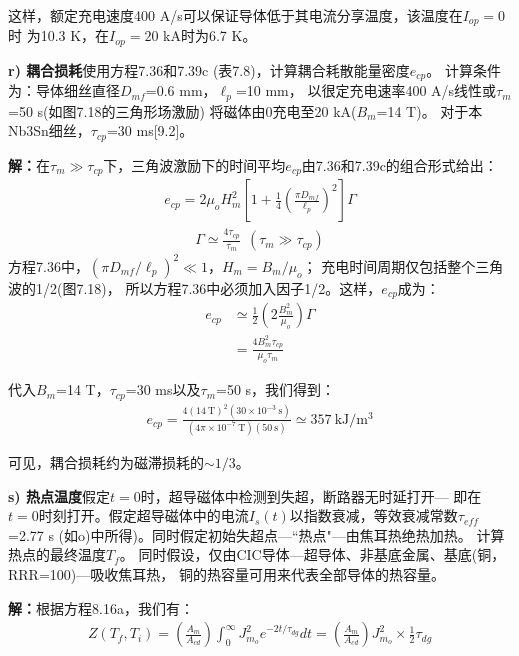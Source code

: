 这样，额定充电速度400 A/s可以保证导体低于其电流分享温度，该温度在$I_{op}=0$时
为10.3 K，在$I_{op}=20$ kA时为6.7 K。

\textbf{r) 耦合损耗}\qquad 使用方程7.36和7.39c (表7.8)，计算耦合耗散能量密度$e_{cp}$。
计算条件为：导体细丝直径$D_{mf}$=0.6 mm，$\ell_p$=10 mm，
以很定充电速率400 A/s线性或$\tau_m$=50 s(如图7.18的三角形场激励)
将磁体由0充电至20 kA($B_m$=14 T)。
对于本Nb3Sn细丝，$\tau_{cp}$=30 ms[9.2]。

\textbf{解：}在$\tau_m\gg \tau_{cp}$下，三角波激励下的时间平均$e_{cp}$由7.36和7.39c的组合形式给出：
\begin{align*}%
e_{cp}=2\mu_oH_{m}^2[1+\frac{1}{4}(\frac{\pi D_{mf}}{\ell_p})^2]\Gamma \tag{7.36}
\end{align*}
\begin{align*}%
\Gamma\simeq\frac{4\tau_{cp}}{\tau_m}\   \  (\tau_m\gg \tau_{cp}) \tag{7.39c}
\end{align*}
方程7.36中，$(\pi D_{mf}/\ell_p)^2\ll 1$，$H_m=B_m/\mu_o$；
充电时间周期仅包括整个三角波的1/2(图7.18)，
所以方程7.36中必须加入因子1/2。这样，$e_{cp}$成为：
\begin{align*}%
e_{cp}&\simeq\frac{1}{2}(2\frac{B_m^2}{\mu_o})\Gamma\\
&=\frac{4B_m^2\tau_{cp}}{\mu_o\tau_m} \tag{r.1}
\end{align*}

代入$B_m$=14 T，$\tau_{cp}$=30 ms以及$\tau_m$=50 s，我们得到：
\begin{align*}%
e_{cp}=\frac{4(14\ \mathrm{T})^2(30\times 10^{-3}\ \mathrm{s})}{(4\pi\times 10^{-7}\ \mathrm{T})(50\ \mathrm{s})}\simeq 357\ \mathrm{kJ/m^3}
\end{align*}

可见，耦合损耗约为磁滞损耗的$\sim 1/3$。

\textbf{s) 热点温度}\qquad 假定$t=0$时，超导磁体中检测到失超，断路器无时延打开---
即在$t=0$时刻打开。假定超导磁体中的电流$I_s(t)$以指数衰减，等效衰减常数$\tau_{eff}$=2.77 s
(如o)中所得)。同时假定初始失超点---``热点"---由焦耳热绝热加热。
计算热点的最终温度$T_f$。
同时假设，仅由CIC导体---超导体、非基底金属、基底(铜，RRR=100)---吸收焦耳热，
铜的热容量可用来代表全部导体的热容量。

\textbf{解：}根据方程8.16a，我们有：
\begin{align*}%
Z(T_f,T_i)=(\frac{A_m}{A_{cd}})\int_{0}^{\infty}J_{m_o}^2e^{-2t/\tau_{dg}}dt=(\frac{A_m}{A_{cd}})J_{m_o}^2\times\frac{1}{2}\tau_{dg} \tag{8.16a}
\end{align*}

